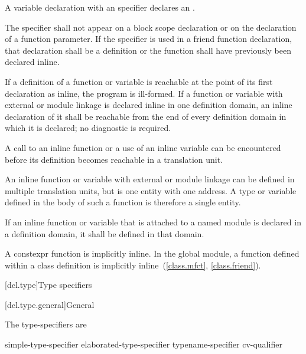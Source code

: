 \pnum
A variable declaration with an  specifier declares an
.

\pnum
The  specifier shall not appear on a block scope declaration or
on the declaration of a function parameter.
If the  specifier is used in a friend function declaration, that
declaration shall be a definition or the function shall have previously
been declared inline.

\pnum
If a definition of a function or variable is reachable
at the point of its
first declaration as inline, the program is ill-formed. If a function or variable
with external or module linkage
is declared inline in one definition domain,
an inline declaration of it shall be reachable
from the end of every definition domain in which it is declared;
no diagnostic is required.
\begin{note}
A call to an inline function or a use of an inline variable can be encountered
before its definition becomes reachable in a translation unit.
\end{note}

\pnum
\begin{note}
An inline function or variable
with external or module linkage
can be defined in multiple translation units,
but is one entity with one address.
A type or  variable
defined in the body of such a function
is therefore a single entity.
\end{note}

\pnum
If an inline function or variable that is attached to a named module
is declared in a definition domain,
it shall be defined in that domain.
\begin{note}
A constexpr function is implicitly inline.
In the global module, a function defined within a class definition
is implicitly inline~(\ref{class.mfct}, \ref{class.friend}).
\end{note}

[dcl.type]{Type specifiers}%

[dcl.type.general]{General}%

\pnum
The type-specifiers are
%
%
%
\begin{bnf}
\br
  simple-type-specifier\br
  elaborated-type-specifier\br
  typename-specifier\br
  cv-qualifier
\end{bnf}

